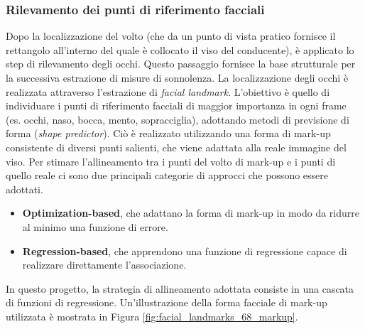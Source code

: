 \documentclass[12pt]{article}
\begin{document}
\begin{table}[h]
	\caption{Comparazione tra i principali algoritmi di localizzazione del volto.}
	\label{table:face_detection}
\end{table}

\subsubsection{Rilevamento dei punti di riferimento facciali}

Dopo la localizzazione del volto (che da un punto di vista pratico fornisce il rettangolo all'interno del quale è collocato il viso del conducente), è applicato lo step di rilevamento degli occhi. Questo passaggio fornisce la base strutturale per la successiva estrazione di misure di sonnolenza. La localizzazione degli occhi è realizzata attraverso l'estrazione di \textit{facial landmark}. L'obiettivo è quello di individuare i punti di riferimento facciali di maggior importanza in ogni frame (es. occhi, naso, bocca, mento, sopracciglia), adottando metodi di previsione di forma (\textit{shape predictor}). Ciò è realizzato utilizzando una forma di mark-up consistente di diversi punti salienti, che viene adattata alla reale immagine del viso. Per stimare l'allineamento tra i punti del volto di mark-up e i punti di quello reale ci sono due principali categorie di approcci che possono essere adottati.
\begin{itemize}
	\item \textbf{Optimization-based}, che adattano la forma di mark-up in modo da ridurre al minimo una funzione di errore.
	\item \textbf{Regression-based}, che apprendono una funzione di regressione capace di realizzare direttamente l'associazione.
\end{itemize}
In questo progetto, la strategia di allineamento adottata consiste in una cascata di funzioni di regressione. Un'illustrazione della forma facciale di mark-up utilizzata è mostrata in Figura \ref{fig:facial_landmarks_68_markup}.
\end{document}
